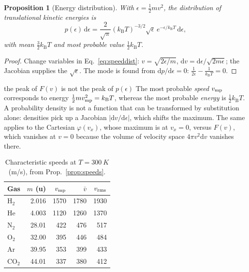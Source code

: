 \documentclass[11pt,a4paper]{report}
\theoremstyle{definition}
\theoremstyle{plain}
\newtheorem{proposition}[definition]{Proposition}
\newcommand{\kB}{k_{\mathrm{B}}}
\newcommand{\dd}{\mathrm{d}}
\newcommand{\vbar}{\bar{v}}
\begin{document}
\begin{proposition}[Energy distribution]\label{prop:Edist}
With $\epsilon=\tfrac12mv^2$, the distribution of translational kinetic energies is
\begin{equation}
p(\epsilon)\,\dd\epsilon=\frac{2}{\sqrt\pi}(\kB T)^{-3/2}\sqrt{\epsilon}\,e^{-\epsilon/\kB T}\,\dd\epsilon,
\end{equation}
with mean $\tfrac32\kB T$ and most probable value $\tfrac12\kB T$.
\end{proposition}
\begin{proof}
Change variables in Eq.~\eqref{eq:speeddist}: $v=\sqrt{2\epsilon/m}$, $\dd v=\dd\epsilon/\sqrt{2m\epsilon}$; the Jacobian supplies the $\sqrt\epsilon$. The mode is found from $\dd p/\dd\epsilon=0$: $\tfrac1{2\epsilon}-\tfrac1{\kB T}=0$.
\end{proof}

\begin{pitfall}{the peak of $F(v)$ is not the peak of $p(\epsilon)$}
The most probable \emph{speed} $v_{\rm mp}$ corresponds to energy $\tfrac12mv_{\rm mp}^2=\kB T$, whereas the most probable \emph{energy} is $\tfrac12\kB T$. A probability density is not a function that can be transformed by substitution alone: densities pick up a Jacobian $|\dd v/\dd\epsilon|$, which shifts the maximum. The same applies to the Cartesian $\varphi(v_x)$, whose maximum is at $v_x=0$, versus $F(v)$, which vanishes at $v=0$ because the volume of velocity space $4\pi v^2\dd v$ vanishes there.
\end{pitfall}

\begin{table}[h]
\centering
\caption{Characteristic speeds at $T=\SI{300}{K}$ (m/s), from Prop.~\ref{prop:speeds}.}
\label{tab:speeds}
\begin{tabular}{@{}lrrrr@{}}
\toprule
Gas & $m$ (u) & $v_{\rm mp}$ & $\vbar$ & $v_{\rm rms}$\\
\midrule
H$_2$ & 2.016 & 1570 & 1780 & 1930\\
He & 4.003 & 1120 & 1260 & 1370\\
N$_2$ & 28.01 & 422 & 476 & 517\\
O$_2$ & 32.00 & 395 & 446 & 484\\
Ar & 39.95 & 353 & 399 & 433\\
CO$_2$ & 44.01 & 337 & 380 & 412\\
\bottomrule
\end{tabular}
\end{table}
\end{document}
